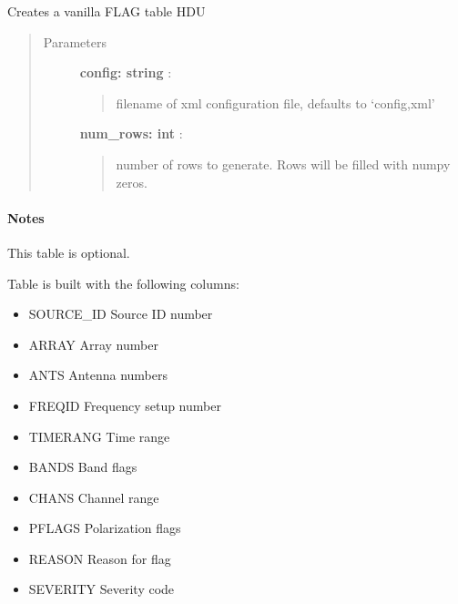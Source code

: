 \documentclass[letterpaper,10pt,english]{sphinxmanual}
\begin{document}
\begin{fulllineitems}
\label{index:pyFitsidi.make_flag}
Creates a vanilla FLAG table HDU
\begin{quote}\begin{description}
\item[{Parameters }] \leavevmode
\textbf{config: string} :
\begin{quote}

filename of xml configuration file, defaults to `config,xml'
\end{quote}

\textbf{num\_rows: int} :
\begin{quote}

number of rows to generate. Rows will be filled with numpy zeros.
\end{quote}

\end{description}\end{quote}
\paragraph{Notes}

This table is optional.

Table is built with the following columns:
\begin{itemize}
\item {} 
SOURCE\_ID Source ID number

\item {} 
ARRAY     Array number

\item {} 
ANTS      Antenna numbers

\item {} 
FREQID    Frequency setup number

\item {} 
TIMERANG  Time range

\item {} 
BANDS     Band flags

\item {} 
CHANS     Channel range

\item {} 
PFLAGS    Polarization flags

\item {} 
REASON    Reason for flag

\item {} 
SEVERITY  Severity code

\end{itemize}

\end{fulllineitems}
\end{document}
